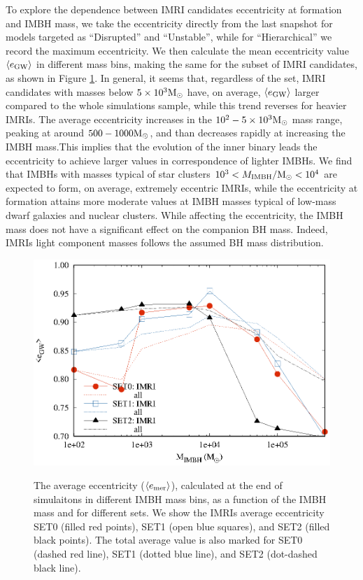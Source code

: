 \documentclass[twocolumn]{aastex62}
\newcommand{\Ms}{{\rm M}_\odot}
\newcommand{\gw}{{\rm GW}}
\newcommand{\ibh}{{\rm IMBH}}
\begin{document}
To explore the dependence between IMRI candidates eccentricity at formation and IMBH mass, we take the eccentricity directly from the last snapshot for models targeted as ``Disrupted'' and ``Unstable'', while for ``Hierarchical'' we record the maximum eccentricity. We then calculate the mean eccentricity value $\langle e_\gw\rangle$  in different mass bins, making the same for the subset of IMRI candidates, as shown in Figure \ref{fig:f5}. In general, it seems that, regardless of the set, IMRI candidates with masses below $5\times10^3\Ms$ have, on average, $\langle e_\gw\rangle$ larger compared to the whole simulations sample, while this trend reverses for heavier IMRIs. 
The average eccentricity increases in the $10^2-5\times10^3\Ms$ mass range, peaking at around $500-1000\Ms$, and than decreases rapidly at increasing the IMBH mass.This implies that the evolution of the inner binary leads the eccentricity to achieve larger values in correspondence of lighter IMBHs. We find that IMBHs with masses typical of star clusters $10^3<M_\ibh/\Ms<10^4$ are expected to form, on average, extremely eccentric IMRIs, while the eccentricity at formation attains more moderate values at IMBH masses typical of low-mass dwarf galaxies and nuclear clusters.
While affecting the eccentricity, the IMBH mass does not have a significant effect on the companion BH mass. Indeed, IMRIs light component masses follows the assumed BH mass distribution. 

\begin{figure}
\centering
\includegraphics[width=\columnwidth]{average_ecc_sets}\\
\caption{The average eccentricity ($\langle e_{\rm mer}\rangle$), calculated at the end of simulaitons in different IMBH mass bins, as a function of the IMBH mass and for different sets. We show the IMRIs average eccentricity SET0 (filled red points), SET1 (open blue squares), and SET2 (filled black points). The total average value is also marked for SET0 (dashed red line), SET1 (dotted blue line), and SET2 (dot-dashed black line). }
\label{fig:f5}
\end{figure}
\end{document}
